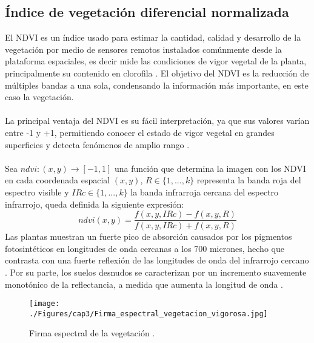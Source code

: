 \subsection{\'Indice de vegetaci\'on diferencial normalizada}\label{subsec:ndvi}
El NDVI es un \'indice usado para estimar la cantidad, calidad y desarrollo de la vegetaci\'on por medio de sensores remotos instalados com\'unmente desde la plataforma espaciales, es decir mide las condiciones de vigor vegetal de la planta, principalmente su contenido en clorofila \cite{salinero2002teledeteccion}. El objetivo del NDVI es la reducci\'on de m\'ultiples bandas a una sola, condensando la informaci\'on m\'as importante, en este caso la vegetaci\'on.\\~\\
La principal ventaja del NDVI es su f\'acil interpretaci\'on, ya que sus valores var\'ian entre -1 y +1, permitiendo conocer el estado de vigor vegetal en grandes superficies y detecta fen\'omenos de amplio rango \cite{salinero2002teledeteccion}.\\~\\
Sea $ ndvi:(x,y) \longrightarrow [-1,1] $ una funci\'on que determina la imagen con los NDVI en cada coordenada espacial $ (x,y) $, $ R \in \{1,...,k\}$ representa la banda roja del espectro visible y $ IRc \in \{1,...,k\}$ la banda infrarroja cercana del espectro infrarrojo, queda definida la siguiente expresi\'on:
	\begin{equation}
	\label{e:ndvi}
	ndvi(x,y)=\dfrac{f(x,y,IRc)-f(x,y,R)}{f(x,y,IRc)+f(x,y,R)}
	\end{equation}
Las plantas muestran un fuerte pico de absorci\'on causados por los pigmentos fotosint\'eticos en longitudes de onda cercanas a los 700 micrones, hecho que contrasta con una fuerte reflexi\'on de las longitudes de onda del infrarrojo cercano \cite{salinero2002teledeteccion}. Por su parte, los suelos desnudos se caracterizan por un incremento suavemente monot\'onico de la reflectancia, a medida que aumenta la longitud de onda \cite{salinero2002teledeteccion}.

  \begin{figure}[H]
  	\centering
  	\texttt{[image: ./Figures/cap3/Firma\_espectral\_vegetacion\_vigorosa.jpg]}
  	\caption{Firma espectral de la vegetaci\'on \cite{ndvi2015com}.}
  	\label{fig:firmaVegetacion}
  \end{figure}


